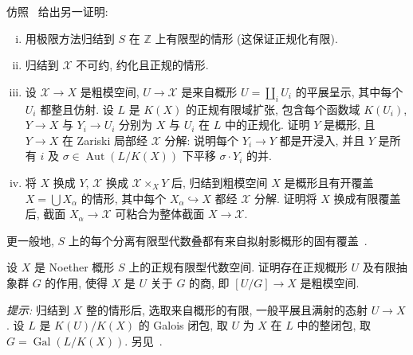 \begin{exercise}\label{src:5.6.2}
仿照~\cite[命题 $2.6$]{Vis89} 给出另一证明:
\begin{enumerate}[(i)]
\item 用极限方法归结到 $S$ 在 $\mathbb Z$ 上有限型的情形 (这保证正规化有限).
\item 归结到 $\mathcal X$ 不可约, 约化且正规的情形.
\item 设 $\mathcal X\to X$ 是粗模空间, $U\to\mathcal X$ 是来自概形 $U=\coprod_i U_i$ 的平展呈示, 其中每个 $U_i$ 都整且仿射. 设 $L$ 是 $K(X)$ 的正规有限域扩张, 包含每个函数域 $K(U_i)$, $Y\to X$ 与 $Y_i\to U_i$ 分别为 $X$ 与 $U_i$ 在 $L$ 中的正规化. 证明 $Y$ 是概形, 且 $Y\to X$ 在 Zariski 局部经 $\mathcal X$ 分解: 说明每个 $Y_i\to Y$ 都是开浸入, 并且 $Y$ 是所有 $i$ 及 $\sigma\in\operatorname{Aut}(L/K(X))$ 下平移 $\sigma\cdot Y_i$ 的并.
\item 将 $X$ 换成 $Y$, $\mathcal X$ 换成 $\mathcal X\times_X Y$ 后, 归结到粗模空间 $X$ 是概形且有开覆盖 $X=\bigcup X_\alpha$ 的情形, 其中每个 $X_\alpha\hookrightarrow X$ 都经 $\mathcal X$ 分解. 证明将 $X$ 换成有限覆盖后, 截面 $X_\alpha\to\mathcal X$ 可粘合为整体截面 $X\to\mathcal X$.
\end{enumerate}
\end{exercise}
\begin{remark}\label{src:5.6.3}
更一般地, $S$ 上的每个分离有限型代数叠都有来自拟射影概形的固有覆盖~\cite{Ols05}.
\end{remark}
\begin{exercise}[很好的练习]\label{src:5.6.4}
设 $X$ 是 Noether 概形 $S$ 上的正规有限型代数空间. 证明存在正规概形 $U$ 及有限抽象群 $G$ 的作用, 使得 $X$ 是 $U$ 关于 $G$ 的商, 即 $[U/G]\to X$ 是粗模空间.

\textit{提示:} 归结到 $X$ 整的情形后, 选取来自概形的有限, 一般平展且满射的态射 $U\to X$. 设 $L$ 是 $K(U)/K(X)$ 的 Galois 闭包, 取 $U$ 为 $X$ 在 $L$ 中的整闭包, 取 $G=\operatorname{Gal}(L/K(X))$. 另见~\cite[推论 $16.6.2$]{LMB00}.
\end{exercise}

